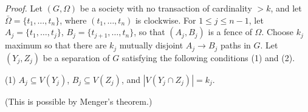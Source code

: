 \textit{Proof.} Let $(G, \Omega)$ be a society with no transaction of cardinality $>k$, and let $\bar{\Omega} = \{t_1, \dots, t_n\}$, where $(t_1, \dots, t_n)$ is clockwise. For $1 \le j \le n-1$, let $A_j = \{t_1, \dots, t_j\}$, $B_j = \{t_{j+1}, \dots, t_n\}$, so that $(A_j, B_j)$ is a fence of $\Omega$. Choose $k_j$ maximum so that there are $k_j$ mutually disjoint $A_j \to B_j$ paths in $G$. Let $(Y_j, Z_j)$ be a separation of $G$ satisfying the following conditions (1) and (2).

\hspace*{12pt}(1) $A_j \subseteq V(Y_j)$, $B_j \subseteq V(Z_j)$, and $|V(Y_j \cap Z_j)| = k_j$.

(This is possible by Menger's theorem.)

